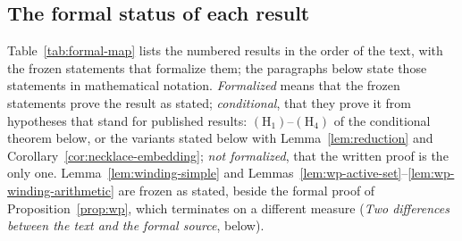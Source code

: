 \documentclass[11pt]{article}
\theoremstyle{definition}
\begin{document}
\subsection*{The formal status of each result}
Table~\ref{tab:formal-map} lists the numbered results in the order of the text, with the frozen statements
that formalize them; the paragraphs below state those statements in mathematical notation. \emph{Formalized}
means that the frozen statements prove the result as stated; \emph{conditional}, that they prove it from
hypotheses that stand for published results: $(\mathrm H_1)$--$(\mathrm H_4)$ of the conditional theorem below, or
the variants stated below with Lemma~\ref{lem:reduction} and Corollary~\ref{cor:necklace-embedding};
\emph{not formalized}, that the written proof is the only one. Lemma~\ref{lem:winding-simple} and
Lemmas~\ref{lem:wp-active-set}--\ref{lem:wp-winding-arithmetic} are frozen as stated, beside the formal proof of
Proposition~\ref{prop:wp}, which terminates on a different measure (\emph{Two differences between the text and the
formal source}, below).
\end{document}
